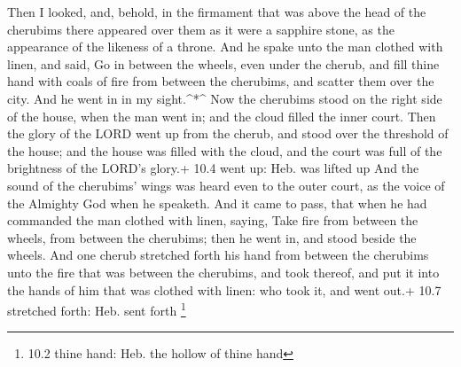  Then I looked, and, behold, in the firmament that was above
the head of the cherubims there appeared over them as it were a sapphire
stone, as the appearance of the likeness of a throne.  And
he spake unto the man clothed with linen, and said, Go in between the
wheels, even under the cherub, and fill thine hand with coals of fire
from between the cherubims, and scatter them over the city. And he went
in in my sight.\^{}*\^{}  Now the cherubims stood on the
right side of the house, when the man went in; and the cloud filled the
inner court.  Then the glory of the LORD went up from the
cherub, and stood over the threshold of the house; and the house was
filled with the cloud, and the court was full of the brightness of the
LORD's glory.+ 10.4 went up: Heb. was lifted up  And the
sound of the cherubims' wings was heard even to the outer court, as the
voice of the Almighty God when he speaketh.  And it came to
pass, that when he had commanded the man clothed with linen, saying,
Take fire from between the wheels, from between the cherubims; then he
went in, and stood beside the wheels.  And one cherub
stretched forth his hand from between the cherubims unto the fire that
was between the cherubims, and took thereof, and put it into the hands
of him that was clothed with linen: who took it, and went out.+ 10.7
stretched forth: Heb. sent forth \footnote{10.2 thine hand: Heb. the
  hollow of thine hand}

